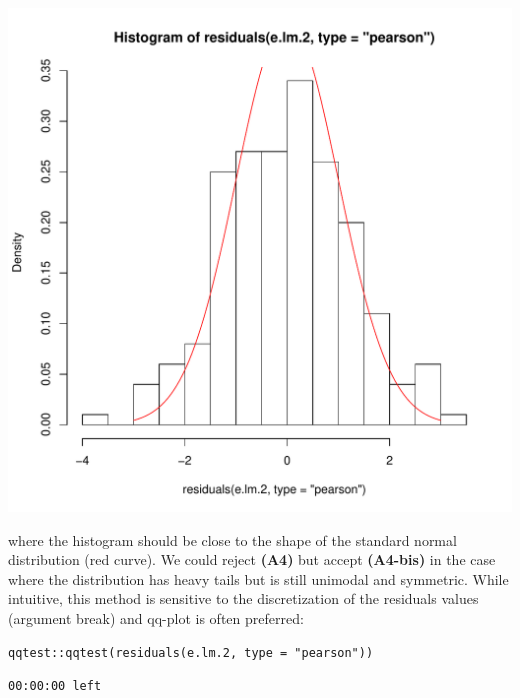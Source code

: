 \documentclass[12pt]{article}
\begin{document}
\begin{center}
\includegraphics[width=.9\linewidth]{./figures/A4-hist-res.pdf}
\end{center}

where the histogram should be close to the shape of the standard
normal distribution (red curve). We could reject \textbf{(A4)} but accept
\textbf{(A4-bis)} in the case where the distribution has heavy tails but is
still unimodal and symmetric. While intuitive, this method is
sensitive to the discretization of the residuals values (argument
break) and qq-plot is often preferred:
\lstset{language=r,label= ,caption= ,captionpos=b,numbers=none}
\begin{lstlisting}
qqtest::qqtest(residuals(e.lm.2, type = "pearson"))
\end{lstlisting}

\begin{verbatim}
00:00:00 left
\end{verbatim}
\end{document}
